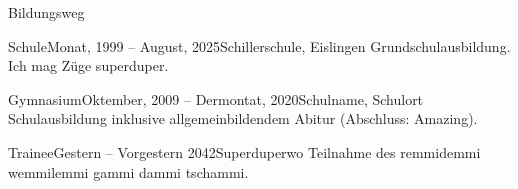 \documentclass{application-maverick}
\begin{document}

    \begin{ap-page}
        
        \begin{block}[\faGraduationCap]{Bildungsweg}
            \begin{timeline}
                \begin{event}{Schule}{Monat, 1999 -- August, 2025}{Schillerschule, Eislingen}
                    Grundschulausbildung. Ich mag Züge superduper.
                \end{event}
                \begin{event}{Gymnasium}{Oktember, 2009 -- Dermontat, 2020}{Schulname, Schulort}
                    Schulausbildung inklusive allgemeinbildendem Abitur (Abschluss: Amazing).
                \end{event}
                \begin{event}{Trainee}{Gestern -- Vorgestern 2042}{Superduperwo}
                    Teilnahme des remmidemmi wemmilemmi gammi dammi tschammi.
                \end{event}
            \end{timeline}
        \end{block}
        


\end{ap-page}
\end{document}
